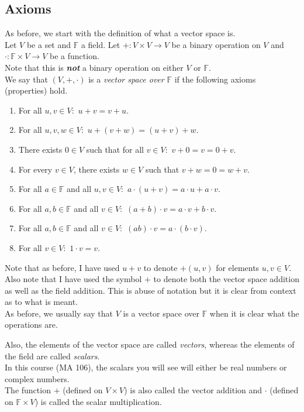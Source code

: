 \documentclass[12pt]{article}
\begin{document}
\subsection{Axioms}
As before, we start with the definition of what a vector space is.\\
Let $V$ be a set and $\mathbb{F}$ a field. Let $+:V\times V\to V$ be a binary operation on $V$ and $\cdot:\mathbb{F}\times V\to V$ be a function.\\
Note that this is \emph{\textbf{not}} a binary operation on either $V$ or $\mathbb{F}.$\\
We say that $(V, +, \cdot)$ is a \emph{vector space over} $\mathbb{F}$ if the following axioms (properties) hold.
\begin{enumerate}[label = (A\arabic*)] 
	\item For all $u, v \in V:$ $u + v = v + u.$
	\item For all $u, v, w \in V:$ $u + (v + w) = (u + v) + w.$
	\item There exists $0 \in V$ such that for all $v \in V:$ $v + 0 = v = 0 + v.$
	\item For every $v \in V$, there exists $w \in V$ such that $v + w = 0 = w + v.$
	\item For all $a \in \mathbb{F}$ and all $u, v \in V:$ $a\cdot(u + v) = a\cdot u + a\cdot v.$
	\item For all $a, b \in \mathbb{F}$ and all $v \in V:$ $(a + b)\cdot v = a\cdot v + b\cdot v.$
	\item For all $a, b \in \mathbb{F}$ and all $v \in V:$ $(ab)\cdot v = a\cdot (b\cdot v).$
	\item For all $v \in V:$ $1\cdot v = v.$
\end{enumerate}
Note that as before, I have used $u + v$ to denote $+(u, v)$ for elements $u, v \in V.$\\
Also note that I have used the symbol $+$ to denote both the vector space addition as well as the field addition. This is abuse of notation but it is clear from context as to what is meant.\\
As before, we usually say that $V$ is a vector space over $\mathbb{F}$ when it is clear what the operations are.

Also, the elements of the vector space are called \emph{vectors}, whereas the elements of the field are called \emph{scalars}.\\
In this course (MA 106), the scalars you will see will either be real numbers or complex numbers.\\
The function $+$ (defined on $V\times V$) is also called the vector addition and $\cdot$ (defined on $\mathbb{F}\times V$) is called the scalar multiplication.
\end{document}
